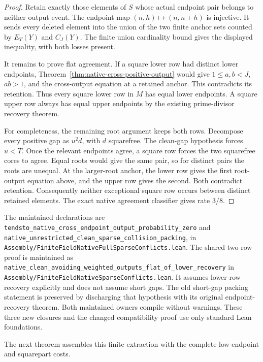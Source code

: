 \documentclass[11pt]{article}
\begin{document}
\begin{proof}
Retain exactly those elements of \(S\) whose actual endpoint
pair belongs to neither output event.
The endpoint map \((n,h)\mapsto(n,n+h)\) is injective.
It sends every deleted element into the union of the two
finite anchor sets counted by \(E_T(Y)\) and \(C_J(Y)\).
The finite union cardinality bound gives the displayed
inequality, with both losses present.

It remains to prove flat agreement.
If a square lower row had distinct lower endpoints,
Theorem~\ref{thm:native-cross-positive-output} would give
\(1\le a,b<J\), \(ab>1\), and the cross-output equation
at a retained anchor. This contradicts its retention.
Thus every square lower row in \(M\) has equal lower
endpoints. A square upper row always has equal upper
endpoints by the existing prime-divisor recovery theorem.

For completeness, the remaining root argument keeps both
rows. Decompose every positive gap as \(u^2d\), with
\(d\) squarefree. The clean-gap hypothesis forces \(u<T\).
Once the relevant endpoints agree, a square row forces the
two squarefree cores to agree. Equal roots would give the
same pair, so for distinct pairs the roots are unequal.
At the larger-root anchor, the lower row gives the first
root-output equation above, and the upper row gives the
second. Both contradict retention.
Consequently neither exceptional square row occurs between
distinct retained elements. The exact native agreement
classifier gives rate \(3/8\).
\end{proof}

The maintained declarations are
\texttt{tendsto\_native\_cross\_endpoint\_output\_probability\_zero}
and \texttt{native\_unrestricted\_clean\_sparse\_collision\_packing},
in \texttt{Assembly/\allowbreak FiniteFieldNativeFullSparseConflicts.\allowbreak lean}.
The shared two-row proof is maintained as
\texttt{native\_clean\_avoiding\_weighted\_outputs\_flat\_of\_lower\_recovery}
in \texttt{Assembly/\allowbreak FiniteFieldNativeSparseConflicts.\allowbreak lean}.
It assumes lower-row recovery explicitly and does not assume short gaps.
The old short-gap packing statement is preserved by
discharging that hypothesis with its original endpoint-recovery theorem.
Both maintained owners compile without warnings.
These three new closures and the changed compatibility proof use only
standard Lean foundations.

The next theorem assembles this finite extraction with the complete
low-endpoint and squarepart costs.
\end{document}
